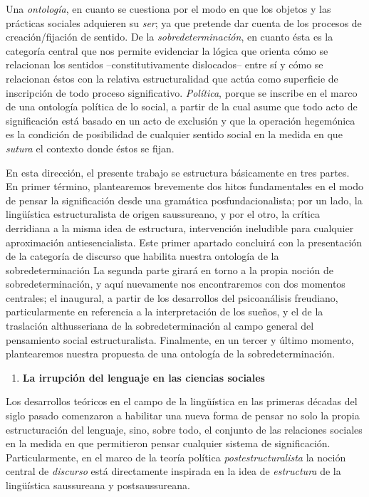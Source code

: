 Una \emph{ontología}, en cuanto se cuestiona por el modo en que los
objetos y las prácticas sociales adquieren su \emph{ser}; ya que
pretende dar cuenta de los procesos de creación/fijación de sentido. De
la \emph{sobredeterminación}, en cuanto ésta es la categoría central que
nos permite evidenciar la lógica que orienta cómo se relacionan los
sentidos --constitutivamente dislocados-- entre sí y cómo se relacionan
éstos con la relativa estructuralidad que actúa como superficie de
inscripción de todo proceso significativo. \emph{Política}, porque se
inscribe en el marco de una ontología política de lo social, a partir de
la cual asume que todo acto de significación está basado en un acto de
exclusión y que la operación hegemónica es la condición de posibilidad
de cualquier sentido social en la medida en que \emph{sutura} el
contexto donde éstos se fijan.

En esta dirección, el presente trabajo se estructura básicamente en tres
partes. En primer término, plantearemos brevemente dos hitos
fundamentales en el modo de pensar la significación desde una gramática
posfundacionalista; por un lado, la lingüística estructuralista de
origen saussureano, y por el otro, la crítica derridiana a la misma idea
de estructura, intervención ineludible para cualquier aproximación
antiesencialista. Este primer apartado concluirá con la presentación de
la categoría de discurso que habilita nuestra ontología de la
sobredeterminación La segunda parte girará en torno a la propia noción
de sobredeterminación, y aquí nuevamente nos encontraremos con dos
momentos centrales; el inaugural, a partir de los desarrollos del
psicoanálisis freudiano, particularmente en referencia a la
interpretación de los sueños, y el de la traslación althusseriana de la
sobredeterminación al campo general del pensamiento social
estructuralista. Finalmente, en un tercer y último momento, plantearemos
nuestra propuesta de una ontología de la sobredeterminación.

\begin{enumerate}
\def\labelenumi{\arabic{enumi}.}
\setcounter{enumi}{1}
\item
  \textbf{La irrupción del lenguaje en las ciencias sociales}
\end{enumerate}

Los desarrollos teóricos en el campo de la lingüística en las primeras
décadas del siglo pasado comenzaron a habilitar una nueva forma de
pensar no solo la propia estructuración del lenguaje, sino, sobre todo,
el conjunto de las relaciones sociales en la medida en que permitieron
pensar cualquier sistema de significación. Particularmente, en el marco
de la teoría política \emph{postestructuralista} la noción central de
\emph{discurso} está directamente inspirada en la idea de
\emph{estructura} de la lingüística saussureana y postsaussureana.

